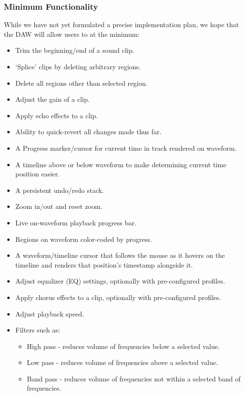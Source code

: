 \documentclass[manuscript,screen,review]{acmart}
\begin{document}
\subsubsection{Minimum Functionality}
While we have not yet formulated a precise implementation plan, we hope that the DAW will allow users to at the minimum:
\begin{itemize}
    \item Trim the beginning/end of a sound clip.
    \item `Splice' clips by deleting arbitrary regions.
    \item Delete all regions other than selected region.
    \item Adjust the gain of a clip.
    \item Apply echo effects to a clip.
    \item Ability to quick-revert all changes made thus far.
    \item A Progress marker/cursor for current time in track rendered on waveform\footnotemark{}.
    \item A timeline above or below waveform to make determining current time position easier\footnotemark[\value{footnote}].
    \item A persistent undo/redo stack\footnotemark[\value{footnote}].
    \item Zoom in/out and reset zoom\footnotemark[\value{footnote}].
    \item Live on-waveform playback progress bar\footnotemark[\value{footnote}].
    \item Regions on waveform color-coded by progress\footnotemark[\value{footnote}].
    \item A waveform/timeline cursor that follows the mouse as it hovers on the timeline and renders that position's timestamp alongside it\footnotemark[\value{footnote}]. 
    
    
    \item Adjust equalizer (EQ) settings, optionally with pre-configured profiles.
    \item Apply chorus effects to a clip, optionally with pre-configured profiles.
    \item Adjust playback speed.
    \item Filters such as:
        \begin{itemize}
            \item High pass - reduces volume of frequencies below a selected value.
            \item Low pass - reduces volume of frequencies above a selected value.
            \item Band pass - reduces volume of frequencies not within a selected band of frequencies.
        \end{itemize}
\end{itemize}
\end{document}
